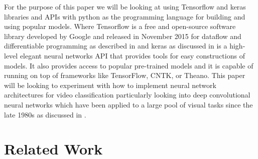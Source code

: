     For the purpose of this paper we will be looking at using Tensorflow and keras libraries and APIs with python as the programming language for building and using popular models. 
    Where Tensorflow is a free and open-source software library developed by Google and released in November 2015 for dataflow and differentiable programming as described in \citep{8578572} and keras as discussed in \citep{Lux:2019:OSC:3310195.3310202} is a high-level elegant neural networks API that provides tools for easy constructions of models. It also provides access to popular pre-trained models and it is capable of running on top of frameworks like TensorFlow, CNTK, or Theano. 
    This paper will be looking to experiment with how to implement neural network architectures for video classification particularly looking into deep convolutional neural networks which have been applied to a large pool of visual tasks since the late 1980s as discussed in \citep{doi:10.1162neco_a_00990}.
    
        \section{Related Work}

